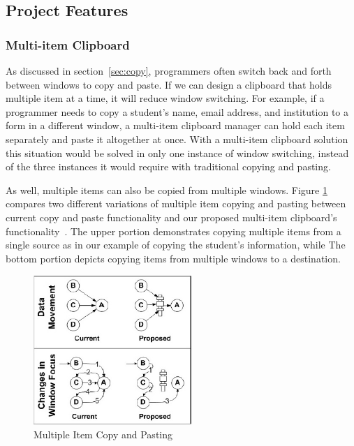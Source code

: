 \documentclass{acm_proc_article-sp}
\begin{document}
\subsection{Project Features}\label{sec:features} 

\subsubsection{Multi-item Clipboard}\label{multiCopy}

As discussed in section~\ref{sec:copy}, programmers often switch back and forth between windows to copy and paste. If we can design a clipboard that holds multiple item at a time, it will reduce window switching. For example, if a programmer needs to copy a student's name, email address, and institution to a form in a different window, a multi-item clipboard manager can hold each item separately and paste it altogether at once. With a multi-item clipboard solution this situation would be solved in only one instance of window switching, instead of the three instances it would require with traditional copying and pasting.
 
As well, multiple items can also be copied from multiple windows. Figure \ref{fig:Multi} compares two different variations of multiple item copying and pasting between current copy and paste functionality and our proposed multi-item clipboard's functionality~\cite{cpHabits}. The upper portion demonstrates copying multiple items from a single source as in our example of copying the student's information, while The bottom portion depicts copying items from multiple windows to a destination.
 
\begin{figure}[h]
\centering
\includegraphics[width=6cm]{MultiItem}
\caption{Multiple Item Copy and Pasting}
\label{fig:Multi}
\end{figure} 
\end{document}
